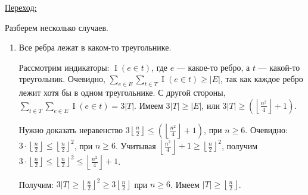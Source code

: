 \begin{solution}
\underline{Переход:}\par Разберем несколько случаев.
\begin{enumerate}
    \item Все ребра лежат в каком-то треугольнике.\par
    Рассмотрим индикаторы: $\operatorname{I}(e \in t)$, где $e$ ---     какое-то ребро, а $t$ --- какой-то треугольник. Очевидно,     $\sum_{e \in E} \sum_{t\in T} \operatorname{I}(e \in t) \geq     |E|$, так как каждое ребро лежит хотя бы в одном треугольнике.     С другой стороны, $\sum_{t \in T} \sum_{e\in E}     \operatorname{I}(e \in t) = 3|T|$. Имеем $3|T|\geq|E|$, или     $3|T|\geq \left(\left\lfloor \frac{n^2}{4}\right\rfloor  + 1\right)$.\par
    Нужно доказать неравенство $3\left\lfloor \frac{n}{2}\right\rfloor  \leq     \left(\left\lfloor \frac{n^2}{4}\right\rfloor  + 1\right)$, при $n \geq 6$.
    Очевидно: \\ $3\cdot\left\lfloor \frac{n}{2}\right\rfloor  \leq {\left\lfloor \frac{n}{2}\right\rfloor }^2$, при $n     \geq 6$. Учитывая $\left\lfloor \frac{n^2}{4}\right\rfloor  + 1\geq {\left\lfloor \frac{n}{2}\right\rfloor }^2$, получим  $3\cdot\left\lfloor \frac{n}{2}\right\rfloor  \leq {\left\lfloor \frac{n}{2}\right\rfloor }^2 \leq     \left\lfloor \frac{n^2}{4}\right\rfloor  + 1$.\par
    Получим: $3|T| \geq \left\lfloor \frac{n}{2}\right\rfloor ^2 \geq 3\left\lfloor \frac{n}{2}\right\rfloor $ при $n     \geq 6$. Имеем $|T| \geq \left\lfloor \frac{n}{2}\right\rfloor $.
    

\end{enumerate}
\end{solution}
